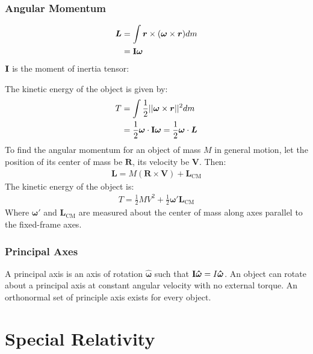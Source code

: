 \documentclass[11pt, letterpaper]{article}
\newcommand{\ve}[1]{
  \ensuremath{\bm{#1}}}	               %
\newcommand{\uve}[1]{
  \ensuremath{\bm{\hat{#1}}}}          %
\newcommand{\tensor}[1]{
  \ensuremath{\text{\bf{#1}}}}         %
\begin{document}
\begin{multicols*}{3}
\subsubsection{Angular Momentum}
\begin{align*}
  \ve{L} &= \int \ve{r} \times (\ve{\omega} \times \ve{r}) dm \\
  &= \tensor{I} \ve{\omega}
\end{align*}
$\tensor{I}$ is the moment of inertia tensor:
\vspace*{-0.7em}
\begin{center}
\end{center}
The kinetic energy of the object is given by:
\begin{align*}
  T &= \int\frac{1}{2} ||\ve{\omega} \times \ve{r}||^2 dm \\
  &= \frac{1}{2} \ve{\omega} \cdot \tensor{I}\ve{\omega} = \frac{1}{2} \ve{\omega} \cdot \ve{L}
\end{align*}
To find the angular momentum for an object of mass $M$ in general motion, let
the position of its center of mass be $\ve{R}$, its velocity be $\ve{V}$. Then:
\begin{align*}
  \ve{L} = M(\ve{R} \times \ve{V}) + \ve{L}_{\text{CM}}
\end{align*}
The kinetic energy of the object is:
\begin{align*}
  T = \frac{1}{2}MV^2 + \frac{1}{2}\ve{\omega}' \ve{L}_{\text{CM}}
\end{align*}
Where $\ve{\omega}'$ and $\ve{L}_{\text{CM}}$ are measured about the center of
mass along axes parallel to the fixed-frame axes.
\subsubsection{Principal Axes}
A principal axis is an axis of rotation $\uve{\omega}$ such that
$\tensor{I}\uve{\omega} = I\uve{\omega}$. An object can rotate about a principal
axis at constant angular velocity with no external torque. An orthonormal set of
principle axis exists for every object.
\section{Special Relativity}

\end{multicols*}
\end{document}
